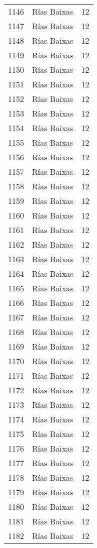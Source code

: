\begin{table}[p]
\begin{tabular}{rlr}
  1146 & Rías Baixas &  12 \\ 
  1147 & Rías Baixas &  12 \\ 
  1148 & Rías Baixas &  12 \\ 
  1149 & Rías Baixas &  12 \\ 
  1150 & Rías Baixas &  12 \\ 
  1151 & Rías Baixas &  12 \\ 
  1152 & Rías Baixas &  12 \\ 
  1153 & Rías Baixas &  12 \\ 
  1154 & Rías Baixas &  12 \\ 
  1155 & Rías Baixas &  12 \\ 
  1156 & Rías Baixas &  12 \\ 
  1157 & Rías Baixas &  12 \\ 
  1158 & Rías Baixas &  12 \\ 
  1159 & Rías Baixas &  12 \\ 
  1160 & Rías Baixas &  12 \\ 
  1161 & Rías Baixas &  12 \\ 
  1162 & Rías Baixas &  12 \\ 
  1163 & Rías Baixas &  12 \\ 
  1164 & Rías Baixas &  12 \\ 
  1165 & Rías Baixas &  12 \\ 
  1166 & Rías Baixas &  12 \\ 
  1167 & Rías Baixas &  12 \\ 
  1168 & Rías Baixas &  12 \\ 
  1169 & Rías Baixas &  12 \\ 
  1170 & Rías Baixas &  12 \\ 
  1171 & Rías Baixas &  12 \\ 
  1172 & Rías Baixas &  12 \\ 
  1173 & Rías Baixas &  12 \\ 
  1174 & Rías Baixas &  12 \\ 
  1175 & Rías Baixas &  12 \\ 
  1176 & Rías Baixas &  12 \\ 
  1177 & Rías Baixas &  12 \\ 
  1178 & Rías Baixas &  12 \\ 
  1179 & Rías Baixas &  12 \\ 
  1180 & Rías Baixas &  12 \\ 
  1181 & Rías Baixas &  12 \\ 
  1182 & Rías Baixas &  12 \\ 

\end{tabular}
\end{table}

